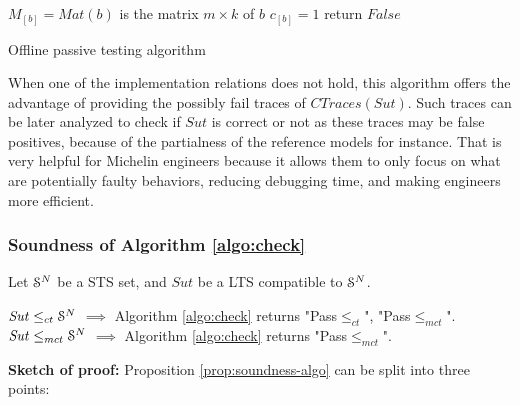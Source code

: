 \begin{algorithm}[h]
{{                $M_{[b]} = Mat(b)$ is the matrix $m \times k$ of $b$\;
                $c_{[b]} = 1$\;
        }
        return $False$\;
    }

    \caption{Offline passive testing algorithm}
    \label{algo:check}
\end{algorithm}

When one of the implementation relations does not hold, this
algorithm offers the advantage of providing the possibly fail
traces of $CTraces({Sut})$. Such traces can be later analyzed to
check if $\mathit{Sut}$ is correct or not as these traces may be
false positives, because of the partialness of the reference
models for instance. That is very helpful for Michelin engineers
because it allows them to only focus on what are potentially
faulty behaviors, reducing debugging time, and making engineers
more efficient.

\subsubsection{Soundness of Algorithm \ref{algo:check}}

\begin{proposition}
    Let $\EuScript{S}^{N}$ be a STS set, and $\mathit{Sut}$ be a
    LTS compatible to $\EuScript{S}^{N}$.

    $\mathit{Sut} \leq_{ct} \EuScript{S}^N$ $\implies$
    Algorithm \ref{algo:check} returns "Pass$\leq_{ct}$",
    "Pass$\leq_{mct}$".\\
    $\mathit{Sut} \leq_{mct} \EuScript{S}^N$ $\implies$
    Algorithm \ref{algo:check} returns "Pass$\leq_{mct}$".

    \label{prop:soundness-algo}
\end{proposition}

\textbf{Sketch of proof:} Proposition \ref{prop:soundness-algo}
can be split into three points:

